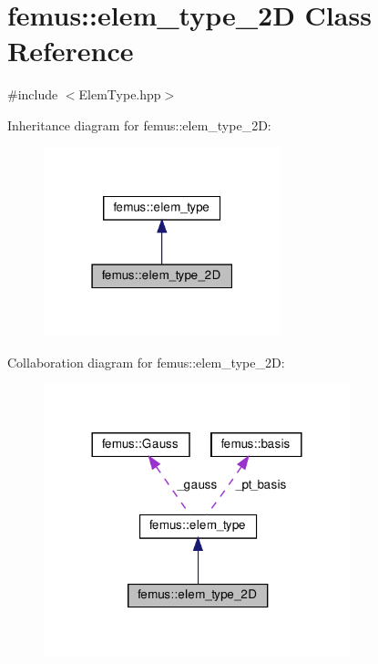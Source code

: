 \hypertarget{classfemus_1_1elem__type__2_d}{}\section{femus\+:\+:elem\+\_\+type\+\_\+2D Class Reference}
\label{classfemus_1_1elem__type__2_d}


{\ttfamily \#include $<$Elem\+Type.\+hpp$>$}



Inheritance diagram for femus\+:\+:elem\+\_\+type\+\_\+2D\+:
\nopagebreak
\begin{figure}[H]
\begin{center}
\leavevmode
\includegraphics[width=195pt]{classfemus_1_1elem__type__2_d__inherit__graph}
\end{center}
\end{figure}


Collaboration diagram for femus\+:\+:elem\+\_\+type\+\_\+2D\+:
\nopagebreak
\begin{figure}[H]
\begin{center}
\leavevmode
\includegraphics[width=252pt]{classfemus_1_1elem__type__2_d__coll__graph}
\end{center}
\end{figure}

